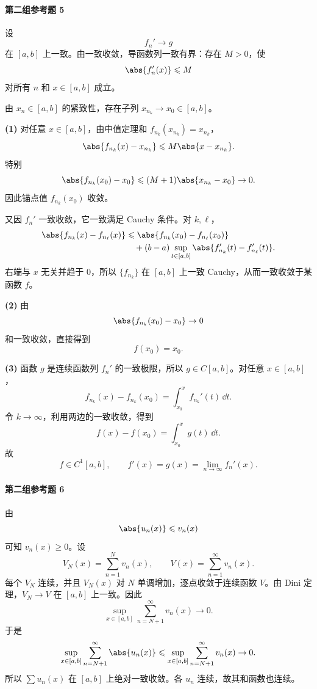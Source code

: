 \paragraph{第二组参考题 5}
\begin{xsolution}
设
\[
  f_n'\to g
\]
在 $[a,b]$ 上一致。由一致收敛，导函数列一致有界：存在 $M>0$，使
\[
  \abs{f_n'(x)}\leqslant M
\]
对所有 $n$ 和 $x\in[a,b]$ 成立。

由 $x_n\in[a,b]$ 的紧致性，存在子列 $x_{n_k}\to x_0\in[a,b]$。

\textbf{(1)} 对任意 $x\in[a,b]$，由中值定理和 $f_{n_k}(x_{n_k})=x_{n_k}$，
\[
  \abs{f_{n_k}(x)-x_{n_k}}
  \leqslant M\abs{x-x_{n_k}}.
\]
特别
\[
  \abs{f_{n_k}(x_0)-x_0}
  \leqslant(M+1)\abs{x_{n_k}-x_0}\to0.
\]
因此锚点值 $f_{n_k}(x_0)$ 收敛。

又因 $f_n'$ 一致收敛，它一致满足 Cauchy 条件。对 $k,\ell$，
\[
\begin{aligned}
  \abs{f_{n_k}(x)-f_{n_\ell}(x)}
  &\leqslant\abs{f_{n_k}(x_0)-f_{n_\ell}(x_0)}\\
  &\quad +(b-a)\sup_{t\in[a,b]}
    \abs{f_{n_k}'(t)-f_{n_\ell}'(t)}.
\end{aligned}
\]
右端与 $x$ 无关并趋于 $0$，所以 $\{f_{n_k}\}$ 在 $[a,b]$ 上一致 Cauchy，从而一致收敛于某函数 $f$。

\textbf{(2)} 由
\[
  \abs{f_{n_k}(x_0)-x_0}\to0
\]
和一致收敛，直接得到
\[
  \boxed{f(x_0)=x_0}.
\]

\textbf{(3)} 函数 $g$ 是连续函数列 $f_n'$ 的一致极限，所以 $g\in C[a,b]$。对任意 $x\in[a,b]$，
\[
  f_{n_k}(x)-f_{n_k}(x_0)
  =\int_{x_0}^{x}f_{n_k}'(t)\,\dd t.
\]
令 $k\to\infty$，利用两边的一致收敛，得到
\[
  f(x)-f(x_0)=\int_{x_0}^{x}g(t)\,\dd t.
\]
故
\[
  f\in C^1[a,b],
  \qquad
  f'(x)=g(x)=\lim_{n\to\infty}f_n'(x).
\]
\end{xsolution}

\paragraph{第二组参考题 6}
\begin{xsolution}
由
\[
  \abs{u_n(x)}\leqslant v_n(x)
\]
可知 $v_n(x)\geqslant0$。设
\[
  V_N(x)=\sum_{n=1}^{N}v_n(x),
  \qquad
  V(x)=\sum_{n=1}^{\infty}v_n(x).
\]
每个 $V_N$ 连续，并且 $V_N(x)$ 对 $N$ 单调增加，逐点收敛于连续函数 $V$。由 Dini 定理，$V_N\to V$ 在 $[a,b]$ 上一致。因此
\[
  \sup_{x\in[a,b]}
  \sum_{n=N+1}^{\infty}v_n(x)\to0.
\]
于是
\[
  \sup_{x\in[a,b]}
  \sum_{n=N+1}^{\infty}\abs{u_n(x)}
  \leqslant
  \sup_{x\in[a,b]}
  \sum_{n=N+1}^{\infty}v_n(x)\to0.
\]
所以 $\sum u_n(x)$ 在 $[a,b]$ 上绝对一致收敛。各 $u_n$ 连续，故其和函数也连续。
\end{xsolution}


